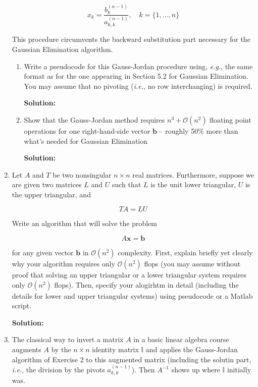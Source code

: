 \documentclass[12pt]{article}
\newcommand{\BigO}[1]{\mathcal{O}\left( #1 \right)}
\newcommand{\Id}{\mathbb{I}}
\begin{document}
\begin{enumerate}
\[
x_{k} = \frac{b_{k}^{(n-1)}}{a_{k,k}^{(n-1)}},\quad k = \{ 1, \ldots, n\}
\]

This procedure circumvents the backward substitution part necessary for the Gaussian Elimination algorithm.

\begin{enumerate}
\item Write a pseudocode for this Gauss-Jordan procedure using, {\em e.g.}, the same format
as for the one appearing in Section 5.2 for Gaussian Elimination. You may assume that no
pivoting ({\em i.e.}, no row interchanging) is required.

{\bf Solution:}

\item Show that the Gauss-Jordan method requires $n^{3} + \BigO{n^{2}}$ floating point operations
for one right-hand-side vector $\mathbf{b}$ -- roughly 50\% more than what's needed for Gaussian Elimination

{\bf Solution:}


\end{enumerate}

\item Let $A$ and $T$ be two nonsingular $n \times n$ real matrices. Furthermore, suppose we are given
two matrices $L$ and $U$ such that $L$ is the unit lower triangular, $U$ is the upper triangular, and

\[
TA = LU
\]

Write an algorithm that will solve the problem

\[
A\mathbf{x} = \mathbf{b}
\]

for any given vector $\mathbf{b}$ in $\BigO{n^{2}}$ complexity. First, explain briefly yet clearly
why your algorithm requires only $\BigO{n^{2}}$ flops (you may assume without proof that solving an upper triangular
or a lower triangular system requires only $\BigO{n^{2}}$ flops). Then, specify your alogirhtm in detail
(including the details for lower and upper triangular systems) using pseudocode or a {\sc Matlab} script.

{\bf Solution:}


\item The classical way to invert a matrix $A$ in a basic linear algebra course augments $A$ by the $n\times n$
identity matrix $\Id$ and applies the Gauss-Jordan algorithm of Exercise 2 to this augmented matrix
(including the solutin part, {\em i.e.}, the division by the pivots $a_{k,k}^{(n-1)}$). Then $A^{-1}$
shows up where $\Id$ initially was.


\end{enumerate}
\end{document}
